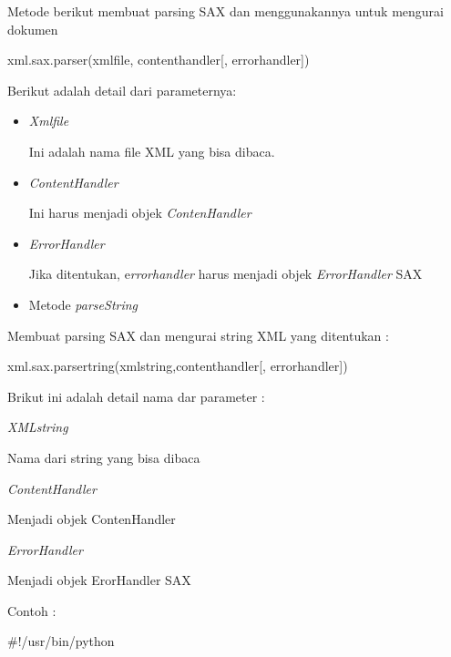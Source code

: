 \documentclass{wileySix}
\begin{document}
\begin{myEnumerate}
\begin{myEnumerate}
	Metode berikut membuat parsing SAX dan menggunakannya untuk mengurai dokumen \par
	\vspace{10pt}
	{\fontsize{10pt}{10pt}\selectfont xml.sax.parser(xmlfile, contenthandler[, errorhandler])} \par
	\vspace{10pt}
	Berikut adalah detail dari parameternya: \par
	\noindent 
	\begin{itemize}
		\item \textit{Xmlfile } \par
		Ini adalah nama file XML yang bisa dibaca. \par
		\noindent 
		\item \textit{ContentHandler } \par
		Ini harus menjadi objek \textit{ContenHandler} \par
		\noindent 
		\item \textit{ErrorHandler} \par
		Jika ditentukan, e\textit{rrorhandler} harus menjadi objek \textit{ErrorHandler} SAX \par
		\noindent 
		\item Metode\textit{ parseString}\end{itemize}
	\par
	Membuat parsing SAX dan mengurai string XML yang ditentukan : \par
	\vspace{12pt}
	{\fontsize{10pt}{10pt}\selectfont xml.sax.parsertring(xmlstring,contenthandler[, errorhandler])} \par
	\vspace{12pt}
	Brikut ini adalah detail nama dar parameter : \par
	\noindent 
	\item \textit{XMLstring} \par
	Nama dari string yang bisa dibaca \par
	\noindent 
	\item \textit{ContentHandler} \par
	Menjadi objek ContenHandler \par
	\noindent 
	\item \textit{ErrorHandler} \par
	Menjadi objek ErorHandler SAX \par
	\vspace{12pt}
	\noindent 
	Contoh : \par
	\noindent 
	$  \#  $!/usr/bin/python \par

\end{myEnumerate}
\end{myEnumerate}
\end{document}

